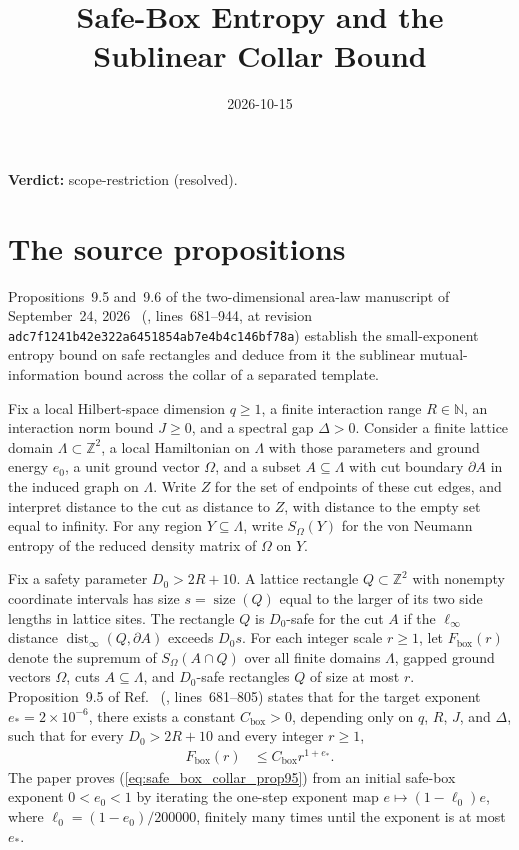 \documentclass{article}
\title{Safe-Box Entropy and the Sublinear Collar Bound}
\author{}
\date{2026-10-15}
\providecommand{\gapnote}[2]{%
    \par\noindent\textbf{Verdict:} #1 (#2).\par}
\begin{document}
\maketitle
\gapnote{scope-restriction}{resolved}

\section{The source propositions}

Propositions~9.5 and~9.6 of the two-dimensional area-law manuscript of
September~24, 2026~\cite{OpenAI2026AreaLaw} (,
lines~681--944, at revision \texttt{adc7f1241b42e322a6451854ab7e4b4c146bf78a})
establish the small-exponent entropy bound on safe rectangles and deduce from
it the sublinear mutual-information bound across the collar of a separated
template.

Fix a local Hilbert-space dimension $q \ge 1$, a finite interaction range
$R \in \mathbb N$, an interaction norm bound $J \ge 0$, and a spectral gap
$\Delta > 0$. Consider a finite lattice domain $\Lambda \subset \mathbb Z^2$, a
local Hamiltonian on $\Lambda$ with those parameters and ground energy $e_0$,
a unit ground vector $\Omega$, and a subset $A \subseteq \Lambda$ with cut
boundary $\partial A$ in the induced graph on $\Lambda$. Write $Z$ for
the set of endpoints of these cut edges, and interpret distance to the cut
as distance to $Z$, with distance to the empty set equal to infinity. For any region
$Y \subseteq \Lambda$, write $S_\Omega(Y)$ for the von Neumann entropy of the
reduced density matrix of $\Omega$ on $Y$.

Fix a safety parameter $D_0 > 2R + 10$. A lattice rectangle
$Q \subset \mathbb Z^2$ with nonempty coordinate intervals has size
$s = \operatorname{size}(Q)$ equal to the larger of its two side lengths in
lattice sites. The rectangle $Q$ is $D_0$-safe for the cut $A$ if the
$\ell_\infty$ distance $\operatorname{dist}_\infty(Q, \partial A)$ exceeds
$D_0 s$. For each integer scale $r \ge 1$, let $F_{\mathrm{box}}(r)$ denote the
supremum of $S_\Omega(A \cap Q)$ over all finite domains $\Lambda$, gapped
ground vectors $\Omega$, cuts $A \subseteq \Lambda$, and $D_0$-safe rectangles
$Q$ of size at most $r$. Proposition~9.5 of Ref.~\cite{OpenAI2026AreaLaw}
(, lines~681--805) states that for the target exponent
$e_* = 2 \times 10^{-6}$, there exists a constant $C_{\mathrm{box}} > 0$,
depending only on $q$, $R$, $J$, and $\Delta$, such that for every
$D_0 > 2R + 10$ and every integer $r \ge 1$,
\begin{align}
    F_{\mathrm{box}}(r)
     & \le C_{\mathrm{box}} r^{1 + e_*}.
    \label{eq:safe_box_collar_prop95}
\end{align}
The paper proves (\ref{eq:safe_box_collar_prop95}) from an initial safe-box
exponent $0 < e_0 < 1$ by iterating the one-step exponent map
$e \mapsto (1 - \ell_0)e$, where $\ell_0 = (1 - e_0)/200000$, finitely many
times until the exponent is at most $e_*$.
\end{document}
